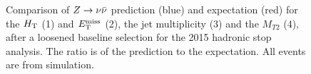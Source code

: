 \begin{figure}[tb!]
{}
\caption{Comparison of $Z\rightarrow \nu\bar{\nu}$ prediction (blue) and expectation (red) for the $H_{\rm T}$ (1) and $E_{\text{T}}^{\rm miss}$ (2), the jet multiplicity (3) and the $M_{T2}$ (4), after a loosened baseline selection for the 2015 hadronic stop analysis. The ratio is of the prediction to the expectation. All events are from simulation.}
\label{fig:ZInvCR_MetHtNjMt2}
\end{figure}

